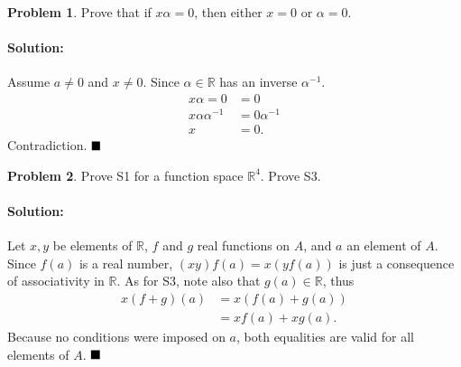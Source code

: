 \documentclass[]{article}
\newcommand{\RR}{\mathbb{R}}
\theoremstyle{definition}
\newtheorem{problem}{Problem}
\newenvironment{solution}{\paragraph{Solution:}}{\hfill$\blacksquare \\$}
\begin{document}
\begin{problem}
	Prove that if $x\alpha = 0$, then either $x=0$ or $\alpha=0$.
\end{problem}
\begin{solution}
	Assume $a \neq 0$ and $x \neq 0$. Since $\alpha \in \RR$ has an inverse $\alpha^{-1}$.
	\begin{align*}
		x\alpha = 0 &= 0 \\
		x\alpha \alpha^{-1} &= 0 \alpha^{-1} \\
		x &= 0.
	\end{align*}
	Contradiction.
\end{solution}
\begin{problem}
	Prove S1 for a function space $\RR^4$. Prove S3.
\end{problem}
\begin{solution}
	Let $x,y$ be elements of $\RR$, $f$ and $g$ real functions on $A$, and $a$ an element of $A$. \\
	Since $f(a)$ is a real number, $(xy)f(a) = x(yf(a))$ is just a consequence of associativity in $\RR$. As for S3, note also that $g(a) \in \RR$, thus
	\begin{align*}
		x(f + g)(a) &= x(f(a) + g(a)) \\
		&= xf(a) + xg(a).
	\end{align*}
Because no conditions were imposed on $a$, both equalities are valid for all elements of $A$.
\end{solution}
\end{document}
